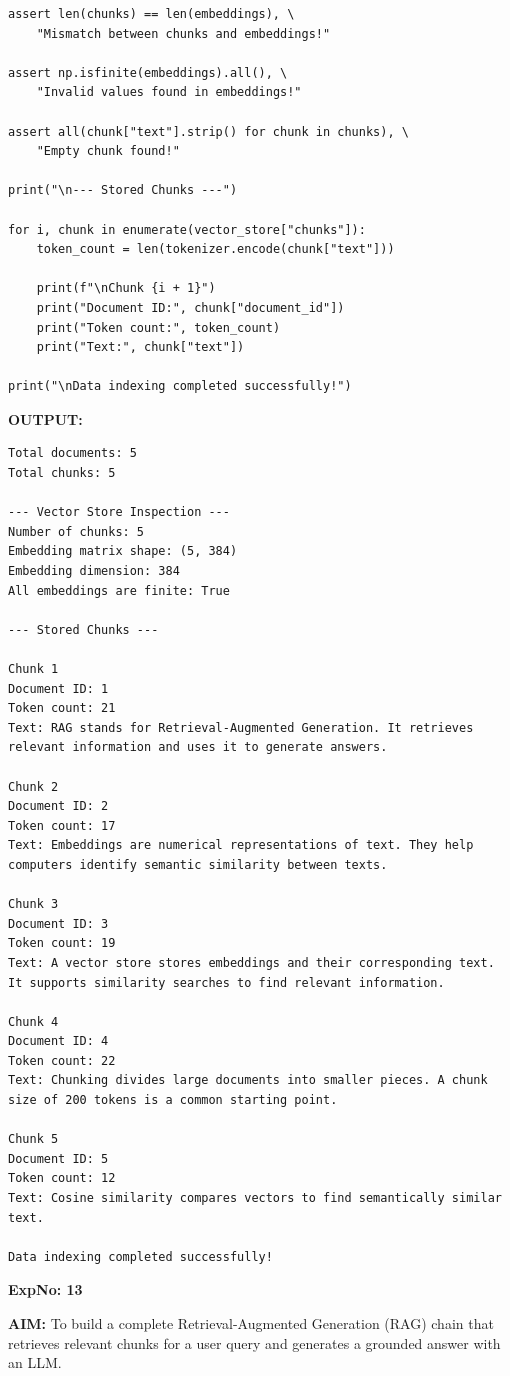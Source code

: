 \documentclass[10pt,a4paper]{article}
\newcommand{\sectionlabel}[1]{\par\vspace{3pt}\noindent\textbf{#1}\par\nopagebreak}
\begin{document}
\begin{lstlisting}[style=code]
assert len(chunks) == len(embeddings), \
    "Mismatch between chunks and embeddings!"

assert np.isfinite(embeddings).all(), \
    "Invalid values found in embeddings!"

assert all(chunk["text"].strip() for chunk in chunks), \
    "Empty chunk found!"

print("\n--- Stored Chunks ---")

for i, chunk in enumerate(vector_store["chunks"]):
    token_count = len(tokenizer.encode(chunk["text"]))

    print(f"\nChunk {i + 1}")
    print("Document ID:", chunk["document_id"])
    print("Token count:", token_count)
    print("Text:", chunk["text"])

print("\nData indexing completed successfully!")
\end{lstlisting}

\sectionlabel{OUTPUT:}
\begin{lstlisting}[style=output]
Total documents: 5
Total chunks: 5

--- Vector Store Inspection ---
Number of chunks: 5
Embedding matrix shape: (5, 384)
Embedding dimension: 384
All embeddings are finite: True

--- Stored Chunks ---

Chunk 1
Document ID: 1
Token count: 21
Text: RAG stands for Retrieval-Augmented Generation. It retrieves relevant information and uses it to generate answers.

Chunk 2
Document ID: 2
Token count: 17
Text: Embeddings are numerical representations of text. They help computers identify semantic similarity between texts.

Chunk 3
Document ID: 3
Token count: 19
Text: A vector store stores embeddings and their corresponding text. It supports similarity searches to find relevant information.

Chunk 4
Document ID: 4
Token count: 22
Text: Chunking divides large documents into smaller pieces. A chunk size of 200 tokens is a common starting point.

Chunk 5
Document ID: 5
Token count: 12
Text: Cosine similarity compares vectors to find semantically similar text.

Data indexing completed successfully!
\end{lstlisting}


\clearpage

\noindent\textbf{ExpNo: 13}

\noindent\textbf{AIM:} To build a complete Retrieval-Augmented Generation (RAG) chain that retrieves relevant chunks for a user query and generates a grounded answer with an LLM.
\end{document}
